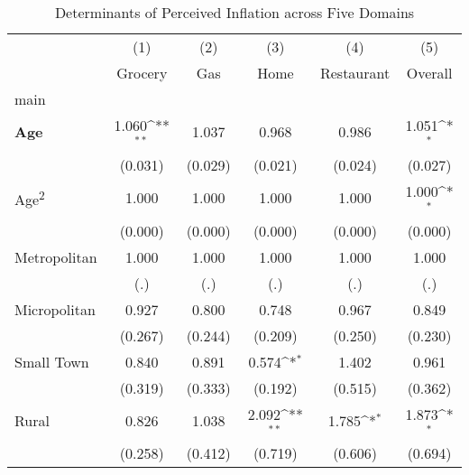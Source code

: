 \begin{table}[htbp]\centering
\def\sym#1{\ifmmode^{#1}\else\(^{#1}\)\fi}
\caption{Determinants of Perceived Inflation across Five Domains}
\begin{tabular}{l*{5}{c}}
\hline\hline
                &\multicolumn{1}{c}{(1)}&\multicolumn{1}{c}{(2)}&\multicolumn{1}{c}{(3)}&\multicolumn{1}{c}{(4)}&\multicolumn{1}{c}{(5)}\\
                &\multicolumn{1}{c}{Grocery}&\multicolumn{1}{c}{Gas}&\multicolumn{1}{c}{Home}&\multicolumn{1}{c}{Restaurant}&\multicolumn{1}{c}{Overall}\\
\hline
main            &                  &                  &                  &                  &                  \\
\textbf{Age}    &    1.060\sym{**} &    1.037         &    0.968         &    0.986         &    1.051\sym{*}  \\
                &  (0.031)         &  (0.029)         &  (0.021)         &  (0.024)         &  (0.027)         \\
[1em]
Age\textsuperscript{2}&    1.000         &    1.000         &    1.000         &    1.000         &    1.000\sym{*}  \\
                &  (0.000)         &  (0.000)         &  (0.000)         &  (0.000)         &  (0.000)         \\
[1em]
Metropolitan    &    1.000         &    1.000         &    1.000         &    1.000         &    1.000         \\
                &      (.)         &      (.)         &      (.)         &      (.)         &      (.)         \\
[1em]
Micropolitan    &    0.927         &    0.800         &    0.748         &    0.967         &    0.849         \\
                &  (0.267)         &  (0.244)         &  (0.209)         &  (0.250)         &  (0.230)         \\
[1em]
Small Town      &    0.840         &    0.891         &    0.574\sym{*}  &    1.402         &    0.961         \\
                &  (0.319)         &  (0.333)         &  (0.192)         &  (0.515)         &  (0.362)         \\
[1em]
Rural           &    0.826         &    1.038         &    2.092\sym{**} &    1.785\sym{*}  &    1.873\sym{*}  \\
                &  (0.258)         &  (0.412)         &  (0.719)         &  (0.606)         &  (0.694)         \\

\end{tabular}
\end{table}
